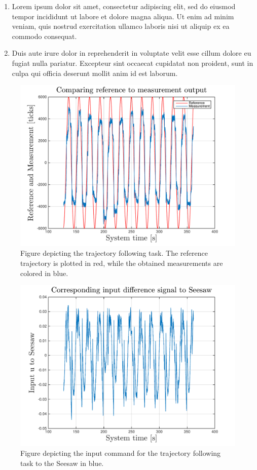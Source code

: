 \documentclass[12pt,a4paper,twocolumn]{article}
\begin{document}
\begin{enumerate}[label=\alph*)]
\item Lorem ipsum dolor sit amet, consectetur adipiscing elit, sed do eiusmod tempor incididunt ut labore et dolore magna aliqua. Ut enim ad minim veniam, quis nostrud exercitation ullamco laboris nisi ut aliquip ex ea commodo consequat. 

\item Duis aute irure dolor in reprehenderit in voluptate velit esse cillum dolore eu fugiat nulla pariatur. Excepteur sint occaecat cupidatat non proident, sunt in culpa qui officia deserunt mollit anim id est laborum.
\end{enumerate}

\begin{figure}[ht]
\centering
\includegraphics[width=.95\linewidth]{figures/seesaw_measurement_task1_fig1}
\caption[Measure1]{\label{f:measure1} Figure depicting the trajectory following task. The reference trajectory is plotted in red, while the obtained measurements are colored in blue.}
\label{fig:seesaw_task1_fig1}
\end{figure}

\begin{figure}[ht]
\centering
\includegraphics[width=.95\linewidth]{figures/seesaw_measurement_task1_fig2}
\caption[Measure1]{\label{f:measure1} Figure depicting the input command for the trajectory following task to the Seesaw in blue.}
\label{fig:seesaw_task1_fig2}
\end{figure}
\end{document}
